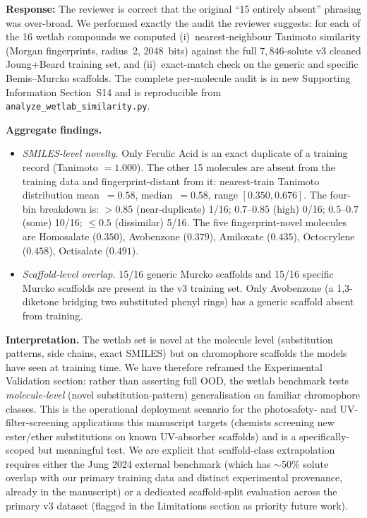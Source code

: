 \documentclass[11pt]{article}
\newcommand{\response}[1]{\noindent\textbf{Response:} #1\par\medskip}
\begin{document}
\response{The reviewer is correct that the original ``15 entirely absent'' phrasing was over-broad. We performed exactly the audit the reviewer suggests: for each of the 16 wetlab compounds we computed (i)~nearest-neighbour Tanimoto similarity (Morgan fingerprints, radius~2, 2048~bits) against the full $7{,}846$-solute v3 cleaned Joung+Beard training set, and (ii)~exact-match check on the generic and specific Bemis--Murcko scaffolds. The complete per-molecule audit is in new Supporting Information Section~S14 and is reproducible from \texttt{analyze\_wetlab\_similarity.py}.

\textbf{Aggregate findings.}
\begin{itemize}[leftmargin=2em,itemsep=2pt]
  \item \emph{SMILES-level novelty.} Only Ferulic Acid is an exact duplicate of a training record (Tanimoto $= 1.000$). The other 15 molecules are absent from the training data and fingerprint-distant from it: nearest-train Tanimoto distribution mean~$= 0.58$, median~$= 0.58$, range $[0.350, 0.676]$. The four-bin breakdown is: $>0.85$ (near-duplicate) 1/16; $0.7$--$0.85$ (high) 0/16; $0.5$--$0.7$ (some) 10/16; $\leq 0.5$ (dissimilar) 5/16. The five fingerprint-novel molecules are Homosalate ($0.350$), Avobenzone ($0.379$), Amiloxate ($0.435$), Octocrylene ($0.458$), Octisalate ($0.491$).
  \item \emph{Scaffold-level overlap.} 15/16 generic Murcko scaffolds and 15/16 specific Murcko scaffolds are present in the v3 training set. Only Avobenzone (a 1,3-diketone bridging two substituted phenyl rings) has a generic scaffold absent from training.
\end{itemize}

\textbf{Interpretation.} The wetlab set is novel at the molecule level (substitution patterns, side chains, exact SMILES) but on chromophore scaffolds the models have seen at training time. We have therefore reframed the Experimental Validation section: rather than asserting full OOD, the wetlab benchmark tests \emph{molecule-level} (novel substitution-pattern) generalisation on familiar chromophore classes. This is the operational deployment scenario for the photosafety- and UV-filter-screening applications this manuscript targets (chemists screening new ester/ether substitutions on known UV-absorber scaffolds) and is a specifically-scoped but meaningful test. We are explicit that scaffold-class extrapolation requires either the Jung 2024 external benchmark (which has $\sim$50\% solute overlap with our primary training data and distinct experimental provenance, already in the manuscript) or a dedicated scaffold-split evaluation across the primary v3 dataset (flagged in the Limitations section as priority future work).

}
\end{document}
